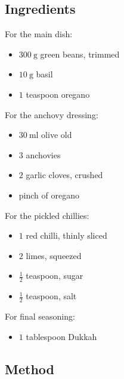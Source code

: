 \documentclass[11pt,a4paper]{article}
\begin{document}
\subsection*{Ingredients}

\begin{multicols}{2}

For the main dish:

\begin{itemize}
  \item $ \qty{300}{\gram} $ green beans, trimmed
  \item $ \qty{10}{\gram} $ basil
  \item $ 1 $ teaspoon oregano
\end{itemize}

For the anchovy dressing:

\begin{itemize}
  \item $ \qty{30}{\ml} $ olive old
  \item $ 3 $ anchovies
  \item $ 2 $ garlic cloves, crushed
  \item pinch of oregano
\end{itemize}

\columnbreak{}

For the pickled chillies:

\begin{itemize}
  \item $ 1 $ red chilli, thinly sliced
  \item $ 2 $ limes, squeezed
  \item $ \frac{1}{2} $ teaspoon, sugar
  \item $ \frac{1}{2} $ teaspoon, salt
\end{itemize}

For final seasoning:

\begin{itemize}
  \item $ 1 $ tablespoon Dukkah
\end{itemize}

\end{multicols}

\medskip

\subsection*{Method}
\end{document}
